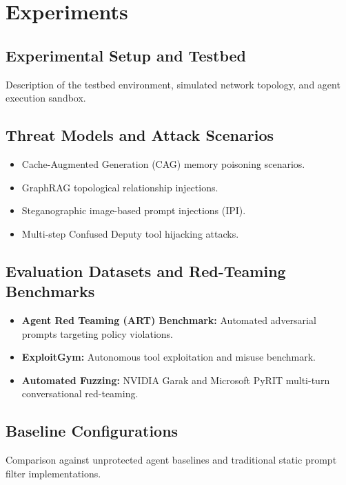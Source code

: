 \chapter{Experiments}
\label{ch:experiments}

\section{Experimental Setup and Testbed}
Description of the testbed environment, simulated network topology, and agent execution sandbox.

\section{Threat Models and Attack Scenarios}
\begin{itemize}
    \item Cache-Augmented Generation (CAG) memory poisoning scenarios.
    \item GraphRAG topological relationship injections.
    \item Steganographic image-based prompt injections (IPI).
    \item Multi-step Confused Deputy tool hijacking attacks.
\end{itemize}

\section{Evaluation Datasets and Red-Teaming Benchmarks}
\begin{itemize}
    \item \textbf{Agent Red Teaming (ART) Benchmark:} Automated adversarial prompts targeting policy violations.
    \item \textbf{ExploitGym:} Autonomous tool exploitation and misuse benchmark.
    \item \textbf{Automated Fuzzing:} NVIDIA Garak and Microsoft PyRIT multi-turn conversational red-teaming.
\end{itemize}

\section{Baseline Configurations}
Comparison against unprotected agent baselines and traditional static prompt filter implementations.
